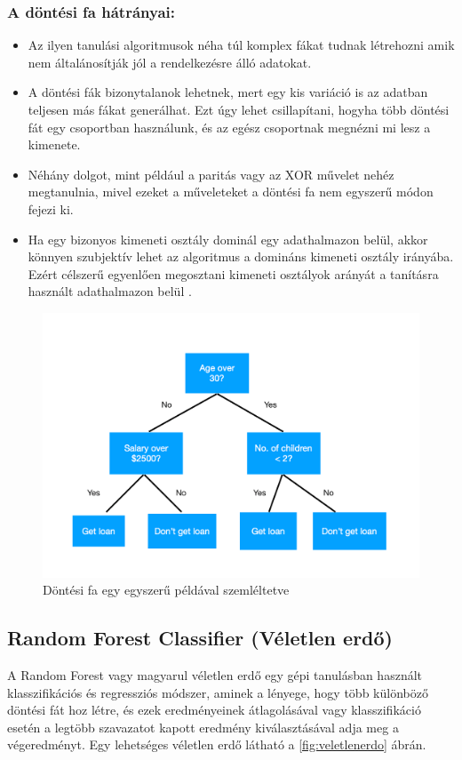 \subsubsection{A döntési fa hátrányai:}
\begin{itemize}
    \item Az ilyen tanulási algoritmusok néha túl komplex fákat tudnak létrehozni amik nem általánosítják jól a rendelkezésre álló adatokat.
    \item A döntési fák bizonytalanok lehetnek, mert egy kis variáció is az adatban teljesen más fákat generálhat. Ezt úgy lehet csillapítani, hogyha több döntési fát egy csoportban használunk, és az egész csoportnak megnézni mi lesz a kimenete.
    \item Néhány dolgot, mint például a paritás vagy az XOR művelet nehéz megtanulnia, mivel ezeket a műveleteket a döntési fa nem egyszerű módon fejezi ki.
    \item Ha egy bizonyos kimeneti osztály dominál egy adathalmazon belül, akkor könnyen szubjektív lehet az algoritmus a domináns kimeneti osztály irányába. Ezért célszerű egyenlően megosztani kimeneti osztályok arányát a tanításra használt adathalmazon belül \cite{dontesi_fa_2}. 
\end{itemize}
\begin{figure}[h]
    \centering
    \includegraphics[width=\linewidth]{images/3.fejezet/DecisionTree.png}
    \caption{Döntési fa egy egyszerű példával szemléltetve \cite{dontesifa_abra}}
    \label{fig:dontesifa}
\end{figure}


\subsection{Random Forest Classifier (Véletlen erdő)}
A Random Forest vagy magyarul véletlen erdő egy gépi tanulásban használt klasszifikációs és regressziós módszer, aminek a lényege, hogy több különböző döntési fát hoz létre, és ezek eredményeinek átlagolásával vagy klasszifikáció esetén a legtöbb szavazatot kapott eredmény kiválasztásával adja meg a végeredményt. Egy lehetséges véletlen erdő látható a \ref{fig:veletlenerdo} ábrán.


